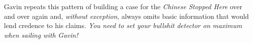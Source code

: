 Gavin repeats this pattern of building a case for the \emph{Chinese
Stopped Here} over and over again and, \emph{without exception}, always
omits basic information that would lend credence to his claims.
\emph{You need to set your bullshit detector on maximum when sailing
with Gavin!}


